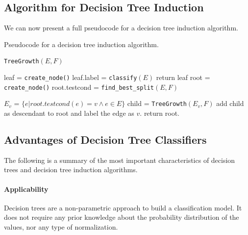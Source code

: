 
\subsection{Algorithm for Decision Tree Induction}

We can now present a full pseudocode for a decision tree induction algorithm.

\begin{algorithm}
\caption{Pseudocode for a decision tree induction algorithm.}
\texttt{TreeGrowth}$(E,F)$
\begin{algorithmic}[1]
            \State leaf = \texttt{create\_node()}
            \State leaf.label = \texttt{classify}$(E)$
            \State return leaf
        \Else
            \State root = \texttt{create\_node()}
            \State root.testcond = \texttt{find\_best\_split}$(E,F)$

                \State $E_v$ = $\{e | root.testcond(e) = v \land e \in E \}$
                \State child = \texttt{TreeGrowth}$(E_v,F)$
                \State add child as descendant to root and label the edge as $v$.
            \EndFor
        \EndIf
        \State return root.
\end{algorithmic}
\end{algorithm}

\subsection{Advantages of Decision Tree Classifiers}

The following is a summary of the most important characteristics of decision trees and decision tree induction algorithms.

\paragraph{Applicability}
Decision trees are a non-parametric approach to build a classification model. It does not require any prior knowledge about the probability distribution of the values, nor any type of normalization.

